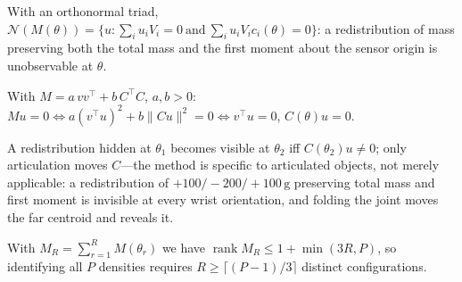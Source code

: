 \begin{proposition}
\label{prop:null}
With an orthonormal triad,
$\mathcal{N}(M(\theta))=\{u:\sum_iu_iV_i=0\ \text{and}\ \sum_iu_iV_ic_i(\theta)
=0\}$: a redistribution of mass preserving both the total mass and the first
moment about the sensor origin is unobservable at $\theta$.
\end{proposition}

\begin{IEEEproof}
With $M=a\,vv^{\!\top}+b\,C^{\!\top}C$, $a,b>0$:
$Mu=0\iff a(v^{\!\top}u)^2+b\|Cu\|^2=0\iff v^{\!\top}u=0$, $C(\theta)u=0$.
\end{IEEEproof}

A redistribution hidden at $\theta_1$ becomes visible at $\theta_2$ iff
$C(\theta_2)u\neq0$; only articulation moves $C$---the method is specific to
articulated objects, not merely applicable: a redistribution of
$+100/-200/+100\,\mathrm{g}$ preserving total mass and first moment is
invisible at every wrist orientation, and folding the joint moves the far
centroid and reveals it.


\begin{proposition}
\label{prop:rounds}
With $M_R=\sum_{r=1}^{R}M(\theta_r)$ we have
$\operatorname{rank}M_R\le1+\min(3R,P)$, so identifying all $P$ densities
requires $R\ge\lceil(P-1)/3\rceil$ distinct configurations.
\end{proposition}

